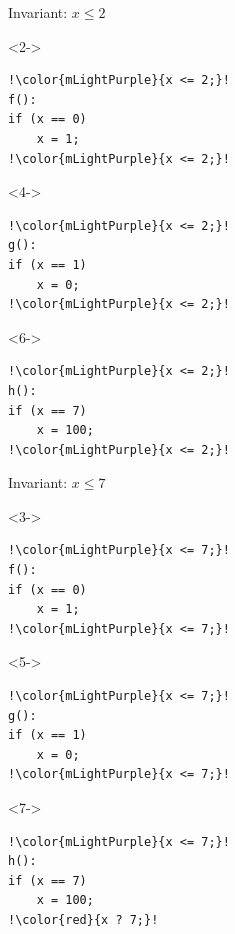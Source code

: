 \documentclass[aspectratio=169,10pt]{beamer}
\begin{document}
\begin{frame}[fragile]{}

\begin{figure}

\noindent\begin{minipage}{.49\textwidth}
Invariant: $x \le 2$
\begin{onlyenv}<2->
\begin{lstlisting}[basicstyle=\scriptsize,escapechar=!]
!\color{mLightPurple}{x <= 2;}!
f():
if (x == 0)
    x = 1;
!\color{mLightPurple}{x <= 2;}!
\end{lstlisting}
\end{onlyenv}

\begin{onlyenv}<4->
\begin{lstlisting}[basicstyle=\scriptsize,escapechar=!]
!\color{mLightPurple}{x <= 2;}!
g():
if (x == 1)
    x = 0;
!\color{mLightPurple}{x <= 2;}!
\end{lstlisting}
\end{onlyenv}

\begin{onlyenv}<6->
\begin{lstlisting}[basicstyle=\scriptsize,escapechar=!]
!\color{mLightPurple}{x <= 2;}!
h():
if (x == 7)
    x = 100;
!\color{mLightPurple}{x <= 2;}!
\end{lstlisting}
\end{onlyenv}

\end{minipage}
\noindent\begin{minipage}{.49\textwidth}
Invariant: $x \le 7$
\begin{onlyenv}<3->
\begin{lstlisting}[basicstyle=\scriptsize,escapechar=!]
!\color{mLightPurple}{x <= 7;}!
f():
if (x == 0)
    x = 1;
!\color{mLightPurple}{x <= 7;}!
\end{lstlisting}
\end{onlyenv}

\begin{onlyenv}<5->
\begin{lstlisting}[basicstyle=\scriptsize,escapechar=!]
!\color{mLightPurple}{x <= 7;}!
g():
if (x == 1)
    x = 0;
!\color{mLightPurple}{x <= 7;}!
\end{lstlisting}
\end{onlyenv}

\begin{onlyenv}<7->
\begin{lstlisting}[basicstyle=\scriptsize,escapechar=!]
!\color{mLightPurple}{x <= 7;}!
h():
if (x == 7)
    x = 100;
!\color{red}{x ? 7;}!
\end{lstlisting}
\end{onlyenv}

\end{minipage}
\end{figure}
\color{white}
\end{frame}
\end{document}
